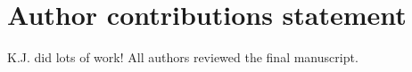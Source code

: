 \section*{Author contributions statement}

K.J. did lots of work! All authors reviewed the final manuscript.
